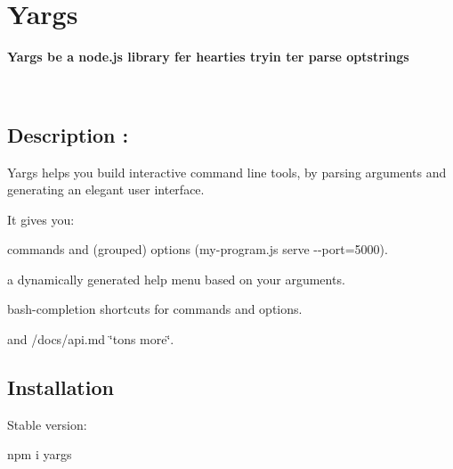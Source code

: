  

\section*{Yargs }

{\bfseries Yargs be a node.\+js library fer hearties tryin\textquotesingle{} ter parse optstrings} 

~\newline


\href{https://travis-ci.org/yargs/yargs}{\tt } \href{https://coveralls.io/github/yargs/yargs}{\tt } \href{https://www.npmjs.com/package/yargs}{\tt } \href{http://standardjs.com/}{\tt } \href{https://conventionalcommits.org/}{\tt } \href{http://devtoolscommunity.herokuapp.com}{\tt }

\subsection*{Description \+:}

Yargs helps you build interactive command line tools, by parsing arguments and generating an elegant user interface.

It gives you\+:


\begin{DoxyItemize}
\item commands and (grouped) options ({\ttfamily my-\/program.\+js serve -\/-\/port=5000}).
\item a dynamically generated help menu based on your arguments.
\end{DoxyItemize}

\begin{quote}
 \end{quote}



\begin{DoxyItemize}
\item bash-\/completion shortcuts for commands and options.
\item and /docs/api.md \char`\"{}tons more\char`\"{}.
\end{DoxyItemize}

\subsection*{Installation}

Stable version\+: 
\begin{DoxyCode}
npm i yargs
\end{DoxyCode}


